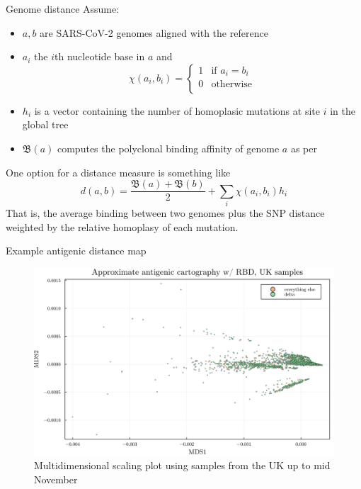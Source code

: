 \documentclass{beamer}
\begin{document}
\begin{frame}{Genome distance}
    Assume:
    \begin{itemize}
        \item $a,b$ are SARS-CoV-2 genomes aligned with the reference
        \item $a_i$ the $i$th nucleotide base in $a$ and
         \[
            \chi(a_i,b_i) =   \begin{cases}
            1 & \text{if $a_i=b_i$} \\
            0 & \text{otherwise} \\
        \end{cases}
        \]
        \item $h_i$ is a vector containing the number of homoplasic mutations at site $i$ in the global tree
        \item $\mathfrak{B}(a)$ computes the polyclonal binding affinity of genome $a$ as per \cite{starr2020deep}
    \end{itemize}
        
    One option for a distance measure is something like
    \begin{equation}
        d(a,b) = \frac{\mathfrak{B}(a) + \mathfrak{B}(b)}{2} + \sum_i \chi(a_i,b_i) h_i
    \end{equation}
    That is, the average binding between two genomes plus the SNP distance weighted by the relative homoplasy of each mutation.
\end{frame}
\begin{frame}{Example antigenic distance map}
    \begin{figure}
        \includegraphics[width=\textwidth]{multidimensional_scaling.png}
        \caption{Multidimensional scaling plot using samples from the UK up to mid November}
    \end{figure}
\end{frame}
\end{document}
